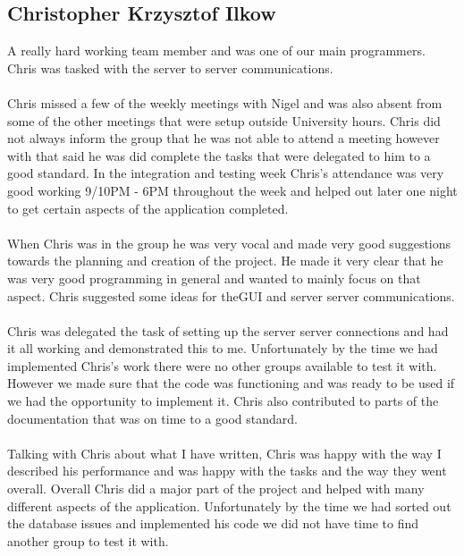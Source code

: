 \documentclass[titlepage]{article}
\begin{document}
{\subsection {Christopher Krzysztof Ilkow}
A really hard working team member and was one of our 
main programmers. Chris was tasked with the server to server communications.
\\
\\
Chris missed a few of the weekly meetings with Nigel and was also absent from some of the other meetings that were setup outside University hours. Chris did not always inform the group that he was not able to attend a meeting however with that said he was did complete the tasks that were delegated to him to a good standard. In the integration and testing week Chris’s attendance was very good working 9/10PM - 6PM throughout the week 
and helped out later one night to get certain aspects of the application completed.
\\
\\
When Chris was in the group he was very vocal and made very good suggestions 
towards the planning and creation of the project. He made it very clear that he was very good programming in general and wanted to mainly focus on that aspect. Chris suggested some ideas for theGUI and server server communications. 
\\
\\
Chris was delegated the task of setting up the server server connections and had it all working and demonstrated this to me. Unfortunately by the time we had implemented Chris’s work there were no other groups available to test it with. However we made sure that the code was functioning and was ready to be used if we had the opportunity to implement it. Chris also contributed to parts of the documentation that was on time to a good standard. 
\\
\\
Talking with Chris about what I have written, Chris was happy with the way I described his performance and was 
happy with the tasks and the way they went overall. Overall Chris did a major part of the project and helped with many different aspects of the application. Unfortunately by the time we had sorted out the database issues and implemented his code we did not have time to find another group to test it with.
}
\end{document}

